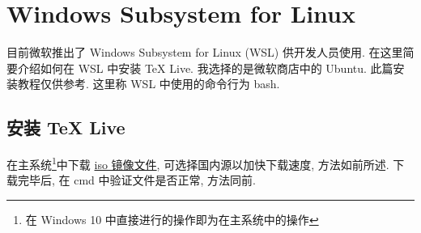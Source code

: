 
\chapter{Windows Subsystem for Linux}

目前微软推出了 Windows Subsystem for Linux (WSL) 供开发人员使用.
在这里简要介绍如何在 WSL 中安装 \TeX{} Live.
我选择的是微软商店中的 Ubuntu.
此篇安装教程仅供参考.
这里称 WSL 中使用的命令行为 \textsf{bash}.

\section{安装 \TeX{} Live}

在主系统\footnote{在 Windows 10 中直接进行的操作即为在主系统中的操作}中下载 \href{http://mirrors.ctan.org/systems/texlive/Images/texlive2019.iso}{iso 镜像文件},
可选择国内源以加快下载速度,
方法如前所述.
下载完毕后, 在 \textsf{cmd} 中验证文件是否正常,
方法同前.

